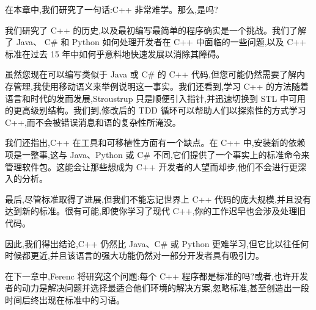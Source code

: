 在本章中,我们研究了一句话:C++ 非常难学。那么,是吗? 

我们研究了 C++ 的历史,以及最初编写最简单的程序确实是一个挑战。我们了解了 Java、 C\# 和 Python 如何处理开发者在 C++ 中面临的一些问题,以及 C++ 标准在过去 15 年中如何乎意料地快速发展以消除其障碍。

虽然您现在可以编写类似于 Java 或 C\# 的 C++ 代码,但您可能仍然需要了解内存管理,我使用移动语义来举例说明这一事实。我们还看到,学习 C++ 的方法随着语言和时代的发而发展,Stroustrup 只是顺便引入指针,并迅速切换到 STL 中可用的更高级别结构。我们到,修改后的 TDD 循环可以帮助人们以探索性的方式学习 C++,而不会被错误消息和语的复杂性所淹没。

我们还指出,C++ 在工具和可移植性方面有一个缺点。在 C++ 中,安装新的依赖项是一整事,这与 Java、Python 或 C\# 不同,它们提供了一个事实上的标准命令来管理软件包。这能会让那些想成为 C++ 开发者的人望而却步,他们不会进行更深入的分析。

最后,尽管标准取得了进展,但我们不能忘记世界上 C++ 代码的庞大规模,并且没有达到新的标准。很有可能,即使你学习了现代 C++,你的工作迟早也会涉及处理旧代码。

因此,我们得出结论,C++ 仍然比 Java、C\# 或 Python 更难学习,但它比以往任何时候都更近,并且该语言的强大功能仍然对一部分开发者具有吸引力。

在下一章中,Ferenc 将研究这个问题:每个 C++ 程序都是标准的吗?或者,也许开发者的动力是解决问题并选择最适合他们环境的解决方案,忽略标准,甚至创造出一段时间后终出现在标准中的习语。